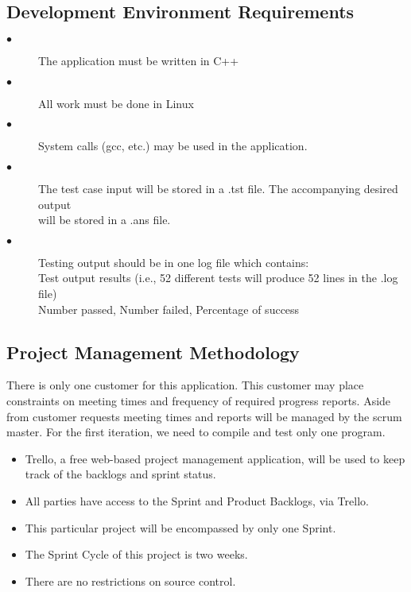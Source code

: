 \subsection{Development Environment Requirements}
\begin{description}
\item [$\bullet$] The application must be written in C++
\item [$\bullet$] All work must be done in Linux
\item [$\bullet$] System calls (gcc, etc.) may be used in the application.
\item [$\bullet$] The test case input will be stored in a .tst file. The accompanying
 desired output \\ will be stored in a .ans file.
\item [$\bullet$] Testing output should be in one log file which contains: \\
\hspace{4ex} Test output results (i.e., 52 different tests will produce 52 lines in the .log file) \\
\hspace{4ex} Number passed, Number failed, Percentage of success
\end{description}

\subsection{Project  Management Methodology}
There is only one customer for this application. This customer may place constraints
on meeting times and frequency of required progress reports. Aside from customer
requests meeting times and reports will be managed by the scrum master.
For the first iteration, we need to compile and test only one program. 

\begin{itemize}
\item Trello, a free web-based project management application, will be used to keep
         track of the backlogs and sprint status.
\item All parties have access to the Sprint and Product Backlogs, via Trello.
\item This particular project will be encompassed by only one Sprint.
\item The Sprint Cycle of this project is two weeks.
\item There are no restrictions on source control.
\end{itemize}

